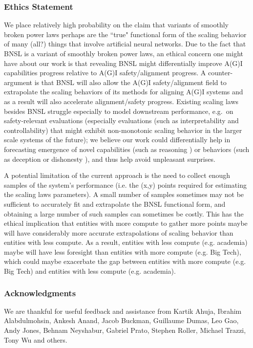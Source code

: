 \documentclass{article} %
\begin{document}
\subsubsection*{Ethics Statement}
We place relatively high probability on the claim that variants of smoothly broken power laws perhaps are the ``true" functional form of the scaling behavior of many (all?) things that involve artificial neural networks. Due to the fact that BNSL is a variant of smoothly broken power laws, an ethical concern one might have about our work is that revealing BNSL might differentially \citep{hendrycks2022x} improve A(G)I capabilities progress relative to A(G)I safety/alignment progress. 
A counter-argument is that BNSL will also allow the A(G)I safety/alignment field to extrapolate the scaling behaviors of its methods for aligning A(G)I systems and as a result will also accelerate alignment/safety progress.
Existing scaling laws besides BNSL struggle especially to model downstream performance, e.g.\ on safety-relevant evaluations (especially evaluations (such as interpretability and controllability) that might exhibit non-monotonic scaling behavior in the larger scale systems of the future); we believe our work could differentially help in forecasting emergence of novel capabilities (such as reasoning \citep{wei2022chain}) or behaviors (such as deception or dishonesty \citep{evans2021truthful,lin2021truthfulqa}), and thus help avoid unpleasant surprises.

A potential limitation of the current approach is the need to collect enough samples of the system’s performance (i.e. the (x,y) points required for estimating the scaling laws parameters). A small number of samples sometimes may not be sufficient to accurately fit and extrapolate the BNSL functional form, and obtaining a large number of such samples can sometimes be costly. This has the ethical implication that entities with more compute to gather more points maybe will have considerably more accurate extrapolations of scaling behavior than entities with less compute. As a result, entities with less compute (e.g. academia) maybe will have less foresight than entities with more compute (e.g. Big Tech), which could maybe exacerbate the gap between entities with more compute (e.g. Big Tech) and entities with less compute (e.g. academia).

\subsubsection*{Acknowledgments}
We are thankful for useful feedback and assistance from Kartik Ahuja, Ibrahim Alabdulmohsin, Ankesh Anand, Jacob Buckman, Guillaume Dumas, Leo Gao, Andy Jones, Behnam Neyshabur, Gabriel Prato, Stephen Roller, Michael Trazzi, Tony Wu and others.
\end{document}
